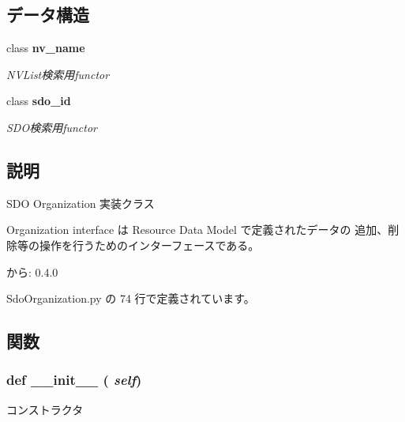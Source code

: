 \subsection*{データ構造}
\begin{CompactItemize}
\item 
class {\bf nv\_\-name}
\begin{CompactList}\small\item\em NVList検索用functor \item\end{CompactList}\item 
class {\bf sdo\_\-id}
\begin{CompactList}\small\item\em SDO検索用functor \item\end{CompactList}\end{CompactItemize}


\subsection{説明}
SDO Organization 実装クラス 

Organization interface は Resource Data Model で定義されたデータの 追加、削除等の操作を行うためのインターフェースである。

\begin{Desc}
\item[から:]0.4.0 \end{Desc}


 SdoOrganization.py の 74 行で定義されています。

\subsection{関数}
\subsubsection{\setlength{\rightskip}{0pt plus 5cm}def \_\-\_\-init\_\-\_\- ( {\em self})}\label{classsource__py_1_1_sdo_organization_1_1_organization__impl_c775ee34451fdfa742b318538164070e}


コンストラクタ 

